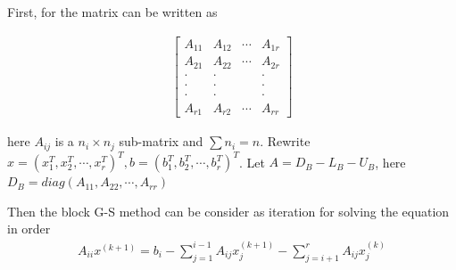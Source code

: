 \documentclass[12pt]{amsart}
\begin{document}
First, for the matrix can be written as

\begin{gather*}
\begin{bmatrix} 
A_{11}&A_{12}&\cdots&A_{1r}\\ 
A_{21}&A_{22}&\cdots&A_{2r}\\
\cdot &\cdot&&\cdot\\ 
\cdot &\cdot&&\cdot\\ 
\cdot &\cdot&&\cdot\\ 
A_{r1}&A_{r2}&\cdots&A_{rr}
\end{bmatrix}
\end{gather*}

here $A_{ij}$ is a $n_i\times n_j$ sub-matrix and $\sum n_i=n$. Rewrite $x=(x_1^T,x_2^T,\cdots,x_r^T)^T,b=(b_1^T,b_2^T,\cdots,b_r^T)^T$. Let $A=D_B-L_B-U_B$, here $D_B=diag(A_{11},A_{22},\cdots,A_{rr})$

Then the block G-S method can be consider as iteration for solving the equation in order
\begin{align*}
	A_{ii}x^{(k+1)}=b_i-\sum_{j=1}^{i-1}A_{ij}x^{(k+1)}_j-\sum_{j=i+1}^{r}A_{ij}x_j^{(k)}
\end{align*}
\end{document}
